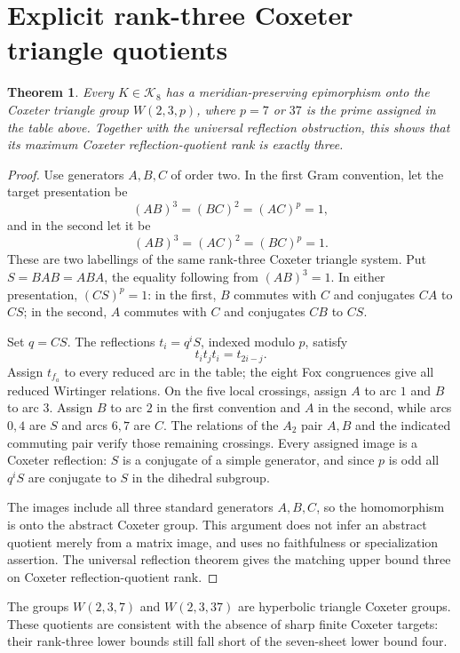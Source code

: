 \documentclass[11pt]{article}
\newtheorem{theorem}{Theorem}
\begin{document}
\section{Explicit rank-three Coxeter triangle quotients}

\begin{theorem}\label{thm:triangle}
Every $K\in\mathcal K_8$ has a meridian-preserving epimorphism onto
the Coxeter triangle group $W(2,3,p)$, where $p=7$ or $37$ is the
prime assigned in the table above. Together with the universal
reflection obstruction, this shows that its maximum Coxeter
reflection-quotient rank is exactly three.
\end{theorem}
\begin{proof}
Use generators $A,B,C$ of order two. In the first Gram convention,
let the target presentation be
\[
       (AB)^3=(BC)^2=(AC)^p=1,
\]
and in the second let it be
\[
       (AB)^3=(AC)^2=(BC)^p=1.
\]
These are two labellings of the same rank-three Coxeter triangle
system. Put $S=BAB=ABA$, the equality following from $(AB)^3=1$.
In either presentation, $(CS)^p=1$: in the first, $B$ commutes with
$C$ and conjugates $CA$ to $CS$; in the second, $A$ commutes with
$C$ and conjugates $CB$ to $CS$.

Set $q=CS$. The reflections $t_i=q^iS$, indexed modulo $p$, satisfy
\[
                           t_i t_j t_i=t_{2i-j}.
\]
Assign $t_{f_a}$ to every reduced arc in the table; the eight Fox
congruences give all reduced Wirtinger relations. On the five local
crossings, assign $A$ to arc $1$ and $B$ to arc $3$. Assign $B$ to
arc $2$ in the first convention and $A$ in the second, while arcs
$0,4$ are $S$ and arcs $6,7$ are $C$. The relations of the $A_2$
pair $A,B$ and the indicated commuting pair verify those remaining
crossings. Every assigned image is a Coxeter reflection: $S$ is a
conjugate of a simple generator, and since $p$ is odd all $q^iS$
are conjugate to $S$ in the dihedral subgroup.

The images include all three standard generators $A,B,C$, so the
homomorphism is onto the abstract Coxeter group. This argument does
not infer an abstract quotient merely from a matrix image, and uses
no faithfulness or specialization assertion. The universal
reflection theorem gives the matching upper bound three on Coxeter
reflection-quotient rank.
\end{proof}

The groups $W(2,3,7)$ and $W(2,3,37)$ are hyperbolic triangle
Coxeter groups. These quotients are consistent with the absence of
sharp finite Coxeter targets: their rank-three lower bounds still
fall short of the seven-sheet lower bound four.
\end{document}
